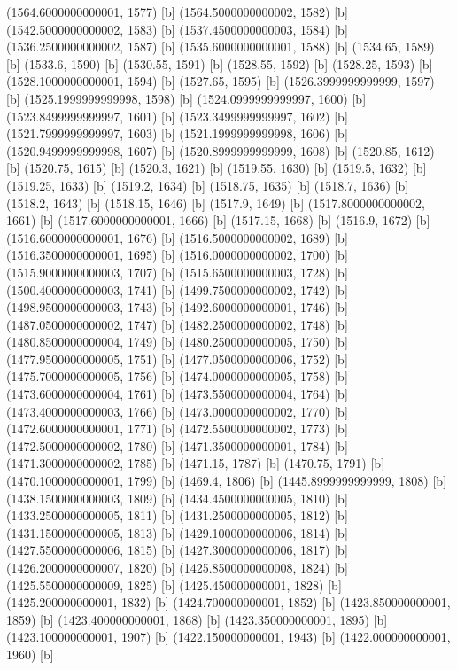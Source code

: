 {{{(1564.6000000000001, 1577) [b] 
(1564.5000000000002, 1582) [b] 
(1542.5000000000002, 1583) [b] 
(1537.4500000000003, 1584) [b] 
(1536.2500000000002, 1587) [b] 
(1535.6000000000001, 1588) [b] 
(1534.65, 1589) [b] 
(1533.6, 1590) [b] 
(1530.55, 1591) [b] 
(1528.55, 1592) [b] 
(1528.25, 1593) [b] 
(1528.1000000000001, 1594) [b] 
(1527.65, 1595) [b] 
(1526.3999999999999, 1597) [b] 
(1525.1999999999998, 1598) [b] 
(1524.0999999999997, 1600) [b] 
(1523.8499999999997, 1601) [b] 
(1523.3499999999997, 1602) [b] 
(1521.7999999999997, 1603) [b] 
(1521.1999999999998, 1606) [b] 
(1520.9499999999998, 1607) [b] 
(1520.8999999999999, 1608) [b] 
(1520.85, 1612) [b] 
(1520.75, 1615) [b] 
(1520.3, 1621) [b] 
(1519.55, 1630) [b] 
(1519.5, 1632) [b] 
(1519.25, 1633) [b] 
(1519.2, 1634) [b] 
(1518.75, 1635) [b] 
(1518.7, 1636) [b] 
(1518.2, 1643) [b] 
(1518.15, 1646) [b] 
(1517.9, 1649) [b] 
(1517.8000000000002, 1661) [b] 
(1517.6000000000001, 1666) [b] 
(1517.15, 1668) [b] 
(1516.9, 1672) [b] 
(1516.6000000000001, 1676) [b] 
(1516.5000000000002, 1689) [b] 
(1516.3500000000001, 1695) [b] 
(1516.0000000000002, 1700) [b] 
(1515.9000000000003, 1707) [b] 
(1515.6500000000003, 1728) [b] 
(1500.4000000000003, 1741) [b] 
(1499.7500000000002, 1742) [b] 
(1498.9500000000003, 1743) [b] 
(1492.6000000000001, 1746) [b] 
(1487.0500000000002, 1747) [b] 
(1482.2500000000002, 1748) [b] 
(1480.8500000000004, 1749) [b] 
(1480.2500000000005, 1750) [b] 
(1477.9500000000005, 1751) [b] 
(1477.0500000000006, 1752) [b] 
(1475.7000000000005, 1756) [b] 
(1474.0000000000005, 1758) [b] 
(1473.6000000000004, 1761) [b] 
(1473.5500000000004, 1764) [b] 
(1473.4000000000003, 1766) [b] 
(1473.0000000000002, 1770) [b] 
(1472.6000000000001, 1771) [b] 
(1472.5500000000002, 1773) [b] 
(1472.5000000000002, 1780) [b] 
(1471.3500000000001, 1784) [b] 
(1471.3000000000002, 1785) [b] 
(1471.15, 1787) [b] 
(1470.75, 1791) [b] 
(1470.1000000000001, 1799) [b] 
(1469.4, 1806) [b] 
(1445.8999999999999, 1808) [b] 
(1438.1500000000003, 1809) [b] 
(1434.4500000000005, 1810) [b] 
(1433.2500000000005, 1811) [b] 
(1431.2500000000005, 1812) [b] 
(1431.1500000000005, 1813) [b] 
(1429.1000000000006, 1814) [b] 
(1427.5500000000006, 1815) [b] 
(1427.3000000000006, 1817) [b] 
(1426.2000000000007, 1820) [b] 
(1425.8500000000008, 1824) [b] 
(1425.5500000000009, 1825) [b] 
(1425.450000000001, 1828) [b] 
(1425.200000000001, 1832) [b] 
(1424.700000000001, 1852) [b] 
(1423.850000000001, 1859) [b] 
(1423.400000000001, 1868) [b] 
(1423.350000000001, 1895) [b] 
(1423.100000000001, 1907) [b] 
(1422.150000000001, 1943) [b] 
(1422.000000000001, 1960) [b] 
}}}
